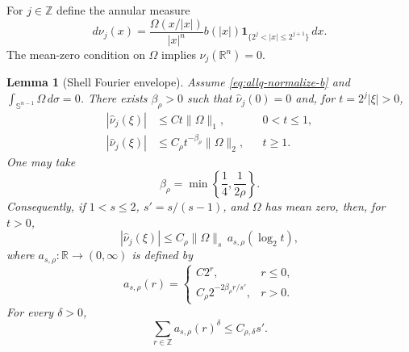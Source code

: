 \documentclass[11pt]{article}
\numberwithin{equation}{section}
\newtheorem{lemma}[theorem]{Lemma}
\theoremstyle{remark}
\theoremstyle{definition}
\newcommand{\R}{\mathbb R}
\newcommand{\Sph}{\mathbb S}
\begin{document}
For $j\in\mathbb Z$ define the annular measure
\begin{equation}\label{eq:allq-shell-measure}
 d\nu_j(x)=
 \frac{\Omega(x/|x|)}{|x|^n}b(|x|)
 \mathbf1_{\{2^j<|x|\le2^{j+1}\}}\,dx.
\end{equation}
The mean-zero condition on $\Omega$ implies $\nu_j(\R^n)=0$.

\begin{lemma}[Shell Fourier envelope]
\label{lem:allq-shell-Fourier}
Assume \eqref{eq:allq-normalize-b} and
$\int_{\Sph^{n-1}}\Omega\,d\sigma=0$.  There exists
$\beta_\rho>0$ such that $\widehat\nu_j(0)=0$ and, for
$t=2^j|\xi|>0$,
\begin{align}
 |\widehat\nu_j(\xi)|
 &\le C t\|\Omega\|_1,
 &&0<t\le1,
 \label{eq:allq-shell-low}\\
 |\widehat\nu_j(\xi)|
 &\le C_\rho t^{-\beta_\rho}\|\Omega\|_2,
 &&t\ge1.
 \label{eq:allq-shell-high-L2}
\end{align}
One may take
\[
 \beta_\rho=\min\left\{\frac14,\frac1{2\rho}\right\}.
\]
Consequently, if $1<s\le2$, $s'=s/(s-1)$, and $\Omega$ has mean zero,
then, for $t>0$,
\begin{equation}\label{eq:allq-shell-Ls}
 |\widehat\nu_j(\xi)|
 \le C_\rho\|\Omega\|_s\,a_{s,\rho}(\log_2t),
\end{equation}
where $a_{s,\rho}:\mathbb R\to(0,\infty)$ is defined by
\begin{equation}\label{eq:allq-envelope}
 a_{s,\rho}(r)=
 \begin{cases}
 C2^r,&r\le0,\\
 C_\rho2^{-2\beta_\rho r/s'},&r>0.
 \end{cases}
\end{equation}
For every $\delta>0$,
\begin{equation}\label{eq:allq-envelope-sum}
 \sum_{r\in\mathbb Z}a_{s,\rho}(r)^\delta
 \le C_{\rho,\delta}s'.
\end{equation}
\end{lemma}
\end{document}
